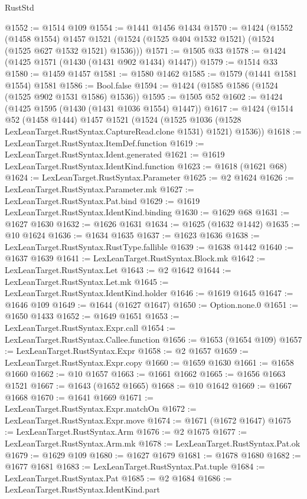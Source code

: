 \begin{lexlean}{RustStd}
\begin{coremodule}
@1552 := @1514 @109
@1554 := @1441 @1456 @1434
@1570 := @1424
    (@1552
      (@1458 @1554)
      @1457
      @1521
      (@1524 (@1525 @404 @1532 @1521) (@1524 (@1525 @627 @1532 @1521) @1536)))
@1571 := @1505 @33
@1578 := @1424 (@1425 @1571 (@1430 (@1431 @902 @1434) @1447))
@1579 := @1514 @33
@1580 := @1459 @1457
@1581 := @1580 @1462
@1585 := @1579 (@1441 @1581 @1554) @1581
@1586 := Bool.false
@1594 := @1424 (@1585 @1586 (@1524 (@1525 @902 @1531 @1586) @1536))
@1595 := @1505 @52
@1602 := @1424 (@1425 @1595 (@1430 (@1431 @1036 @1554) @1447))
@1617 := @1424
    (@1514
      @52
      (@1458 @1444)
      @1457
      @1521
      (@1524 (@1525 @1036 (@1528 LexLeanTarget.RustSyntax.CaptureRead.clone @1531) @1521) @1536))
@1618 := LexLeanTarget.RustSyntax.ItemDef.function
@1619 := LexLeanTarget.RustSyntax.Ident.generated
@1621 := @1619 LexLeanTarget.RustSyntax.IdentKind.function
@1623 := @1618 (@1621 @68)
@1624 := LexLeanTarget.RustSyntax.Parameter
@1625 := @2 @1624
@1626 := LexLeanTarget.RustSyntax.Parameter.mk
@1627 := LexLeanTarget.RustSyntax.Pat.bind
@1629 := @1619 LexLeanTarget.RustSyntax.IdentKind.binding
@1630 := @1629 @68
@1631 := @1627 @1630
@1632 := @1626 @1631
@1634 := @1625 (@1632 @1442)
@1635 := @10 @1624
@1636 := @1634 @1635
@1637 := @1623 @1636
@1638 := LexLeanTarget.RustSyntax.RustType.fallible
@1639 := @1638 @1442
@1640 := @1637 @1639
@1641 := LexLeanTarget.RustSyntax.Block.mk
@1642 := LexLeanTarget.RustSyntax.Let
@1643 := @2 @1642
@1644 := LexLeanTarget.RustSyntax.Let.mk
@1645 := LexLeanTarget.RustSyntax.IdentKind.holder
@1646 := @1619 @1645
@1647 := @1646 @109
@1649 := @1644 (@1627 @1647)
@1650 := Option.none.{0}
@1651 := @1650 @1433
@1652 := @1649 @1651
@1653 := LexLeanTarget.RustSyntax.Expr.call
@1654 := LexLeanTarget.RustSyntax.Callee.function
@1656 := @1653 (@1654 @109)
@1657 := LexLeanTarget.RustSyntax.Expr
@1658 := @2 @1657
@1659 := LexLeanTarget.RustSyntax.Expr.copy
@1660 := @1659 @1630
@1661 := @1658 @1660
@1662 := @10 @1657
@1663 := @1661 @1662
@1665 := @1656 @1663 @1521
@1667 := @1643 (@1652 @1665)
@1668 := @10 @1642
@1669 := @1667 @1668
@1670 := @1641 @1669
@1671 := LexLeanTarget.RustSyntax.Expr.matchOn
@1672 := LexLeanTarget.RustSyntax.Expr.move
@1674 := @1671 (@1672 @1647)
@1675 := LexLeanTarget.RustSyntax.Arm
@1676 := @2 @1675
@1677 := LexLeanTarget.RustSyntax.Arm.mk
@1678 := LexLeanTarget.RustSyntax.Pat.ok
@1679 := @1629 @109
@1680 := @1627 @1679
@1681 := @1678 @1680
@1682 := @1677 @1681
@1683 := LexLeanTarget.RustSyntax.Pat.tuple
@1684 := LexLeanTarget.RustSyntax.Pat
@1685 := @2 @1684
@1686 := LexLeanTarget.RustSyntax.IdentKind.part

\end{coremodule}
\end{lexlean}

